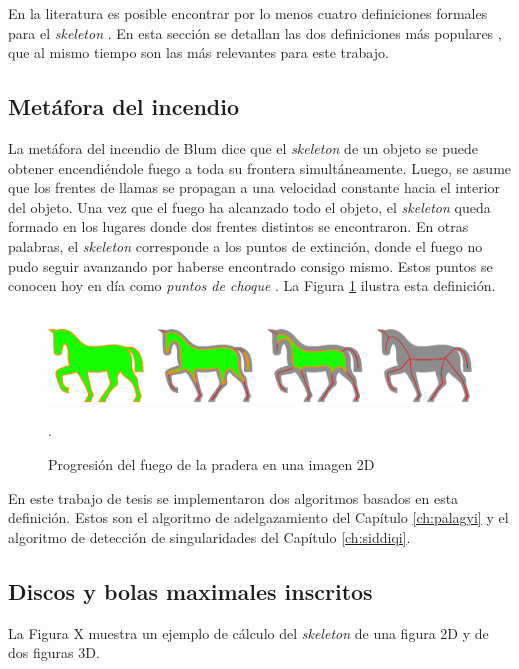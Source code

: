 En la literatura es posible encontrar por lo menos cuatro definiciones formales para el \textit{skeleton} \cite{tagliasacchi20163d}. En esta sección se detallan las dos definiciones más populares \cite{cornea2005computing}, que al mismo tiempo son las más relevantes para este trabajo.



\subsection{Metáfora del incendio}
\label{ssec:grassfire}

La metáfora del incendio de Blum \cite{Blum:1967} dice que el \textit{skeleton} de un objeto se puede obtener encendiéndole fuego a toda su frontera simultáneamente. Luego, se asume que los frentes de llamas se propagan a una velocidad constante hacia el interior del objeto. Una vez que el fuego ha alcanzado todo el objeto, el \textit{skeleton} queda formado en los lugares donde dos frentes distintos se encontraron. En otras palabras, el \textit{skeleton} corresponde a los puntos de extinción, donde el fuego no pudo seguir avanzando por haberse encontrado consigo mismo. Estos puntos se conocen hoy en día como \textit{puntos de choque} \cite{leymarie2003three}. La Figura \ref{fig:horseonfire} ilustra esta definición.
\\\\
\begin{figure}[ht]\centering
\includegraphics[width=0.9\linewidth]{images/horseonfire}
\caption{Progresión del fuego de la pradera en una imagen 2D}.
\label{fig:horseonfire}
\end{figure}

En este trabajo de tesis se implementaron dos algoritmos basados en esta definición. Estos son el algoritmo de adelgazamiento del Capítulo \ref{ch:palagyi} y el algoritmo de detección de singularidades del Capítulo \ref{ch:siddiqi}.

\subsection{Discos y bolas maximales inscritos}

La Figura X muestra un ejemplo de cálculo del \textit{skeleton} de una figura 2D y de dos figuras 3D.

